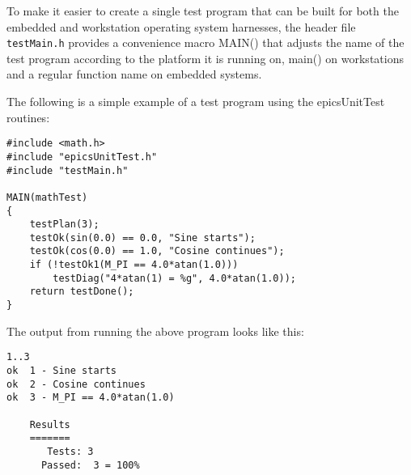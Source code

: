To make it easier to create a single test program that can be built for both the embedded and workstation operating system 
harnesses, the header file \verb|testMain.h| provides a convenience macro MAIN() that adjusts the name of the test program 
according to the platform it is running on, main() on workstations and a regular function name on embedded systems.

The following is a simple example of a test program using the epicsUnitTest routines:

\begin{verbatim}#include <math.h>
#include "epicsUnitTest.h"
#include "testMain.h"

MAIN(mathTest)
{
    testPlan(3);
    testOk(sin(0.0) == 0.0, "Sine starts");
    testOk(cos(0.0) == 1.0, "Cosine continues");
    if (!testOk1(M_PI == 4.0*atan(1.0)))
        testDiag("4*atan(1) = %g", 4.0*atan(1.0));
    return testDone();
}
\end{verbatim}The output from running the above program looks like this:

\begin{verbatim}1..3
ok  1 - Sine starts
ok  2 - Cosine continues
ok  3 - M_PI == 4.0*atan(1.0)

    Results
    =======
       Tests: 3
      Passed:  3 = 100%

\end{verbatim}
